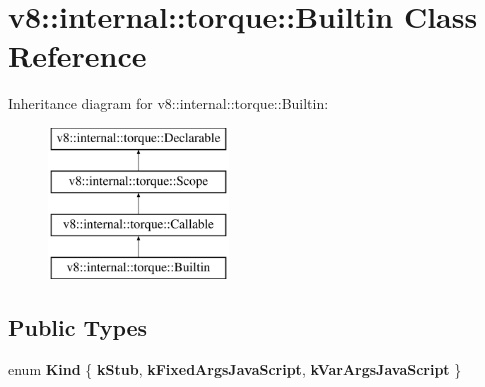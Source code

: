 \hypertarget{classv8_1_1internal_1_1torque_1_1Builtin}{}\section{v8\+:\+:internal\+:\+:torque\+:\+:Builtin Class Reference}
\label{classv8_1_1internal_1_1torque_1_1Builtin}
Inheritance diagram for v8\+:\+:internal\+:\+:torque\+:\+:Builtin\+:\begin{figure}[H]
\begin{center}
\leavevmode
\includegraphics[height=4.000000cm]{classv8_1_1internal_1_1torque_1_1Builtin}
\end{center}
\end{figure}
\subsection*{Public Types}
\begin{DoxyCompactItemize}
\item 
\mbox{\label{classv8_1_1internal_1_1torque_1_1Builtin_aebea5c698800d26fc469a2ded8785a51}} 
enum {\bfseries Kind} \{ {\bfseries k\+Stub}, 
{\bfseries k\+Fixed\+Args\+Java\+Script}, 
{\bfseries k\+Var\+Args\+Java\+Script}
 \}
\end{DoxyCompactItemize}
